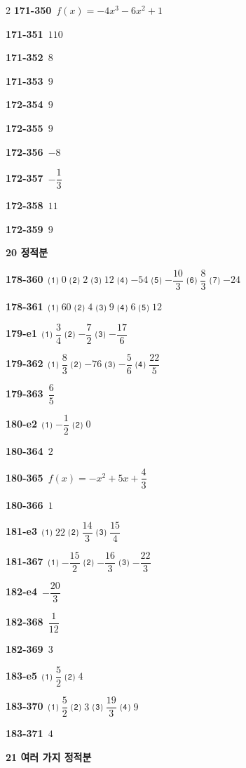 \documentclass[10pt,a4paper]{article}
\begin{document}
\begin{multicols}{2}
\noindent\textbf{171-350}\ $f(x)=-4x^3-6x^2+1$\par
\noindent\textbf{171-351}\ $110$\par
\noindent\textbf{171-352}\ $8$\par
\noindent\textbf{171-353}\ $9$\par
\noindent\textbf{172-354}\ $9$\par
\noindent\textbf{172-355}\ $9$\par
\noindent\textbf{172-356}\ $-8$\par
\noindent\textbf{172-357}\ $-\dfrac{1}{3}$\par
\noindent\textbf{172-358}\ $11$\par
\noindent\textbf{172-359}\ $9$\par
\noindent\textbf{20 정적분}\par\smallskip
\noindent\textbf{178-360}\ ⑴ $0$ ⑵ $2$ ⑶ $12$ ⑷ $-54$ ⑸ $-\dfrac{10}{3}$ ⑹ $\dfrac{8}{3}$ ⑺ $-24$\par
\noindent\textbf{178-361}\ ⑴ $60$ ⑵ $4$ ⑶ $9$ ⑷ $6$ ⑸ $12$\par
\noindent\textbf{179-e1}\ ⑴ $\dfrac{3}{4}$ ⑵ $-\dfrac{7}{2}$ ⑶ $-\dfrac{17}{6}$\par
\noindent\textbf{179-362}\ ⑴ $\dfrac{8}{3}$ ⑵ $-76$ ⑶ $-\dfrac{5}{6}$ ⑷ $\dfrac{22}{5}$\par
\noindent\textbf{179-363}\ $\dfrac{6}{5}$\par
\noindent\textbf{180-e2}\ ⑴ $-\dfrac{1}{2}$ ⑵ $0$\par
\noindent\textbf{180-364}\ $2$\par
\noindent\textbf{180-365}\ $f(x)=-x^2+5x+\dfrac{4}{3}$\par
\noindent\textbf{180-366}\ $1$\par
\noindent\textbf{181-e3}\ ⑴ $22$ ⑵ $\dfrac{14}{3}$ ⑶ $\dfrac{15}{4}$\par
\noindent\textbf{181-367}\ ⑴ $-\dfrac{15}{2}$ ⑵ $-\dfrac{16}{3}$ ⑶ $-\dfrac{22}{3}$\par
\noindent\textbf{182-e4}\ $-\dfrac{20}{3}$\par
\noindent\textbf{182-368}\ $\dfrac{1}{12}$\par
\noindent\textbf{182-369}\ $3$\par
\noindent\textbf{183-e5}\ ⑴ $\dfrac{5}{2}$ ⑵ $4$\par
\noindent\textbf{183-370}\ ⑴ $\dfrac{5}{2}$ ⑵ $3$ ⑶ $\dfrac{19}{3}$ ⑷ $9$\par
\noindent\textbf{183-371}\ $4$\par
\noindent\textbf{21 여러 가지 정적분}\par\smallskip

\end{multicols}
\end{document}
